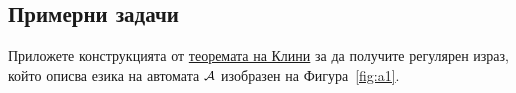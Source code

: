 \subsection{Примерни задачи}

\begin{extra}
\begin{problem}
  Приложете конструкцията от \hyperref[th:regular:kleenef]{теоремата на Клини} за да получите регулярен израз, който описва езика на автомата $\mathcal{A}$ изобразен на Фигура~\ref{fig:a1}.
    \begin{figure}[H]
      \begin{center}
\end{center}
\end{figure}
\end{problem}
\end{extra}
